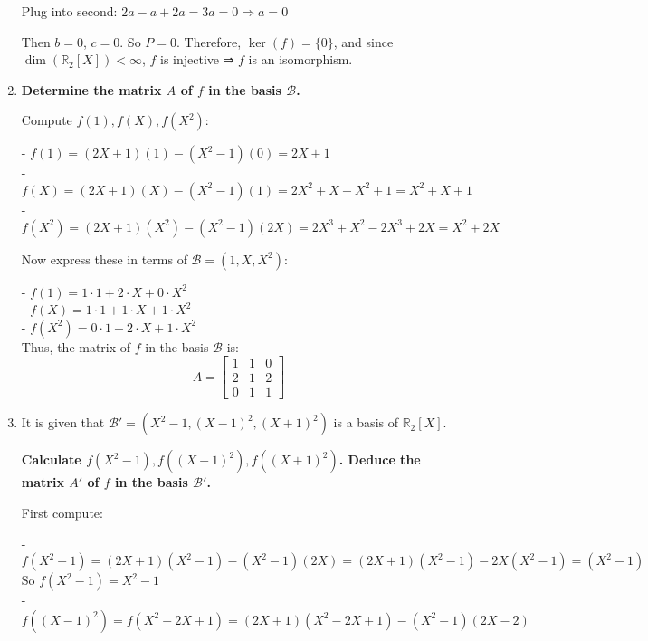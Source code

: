 \documentclass[12pt]{article}
\begin{document}
\begin{answerbox}
\begin{enumerate}
Plug into second: $ 2a - a + 2a = 3a = 0 \Rightarrow a = 0 $

Then $ b = 0 $, $ c = 0 $. So $ P = 0 $. Therefore, $ \ker(f) = \{0\} $, and since $ \dim(\mathbb{R}_2[X]) < \infty $, $ f $ is injective ⇒ $ f $ is an isomorphism.

\bigskip

\item \textbf{Determine the matrix $ A $ of $ f $ in the basis $ \mathcal{B} $.}

Compute $ f(1), f(X), f(X^2) $:

- $ f(1) = (2X + 1)(1) - (X^2 - 1)(0) = 2X + 1 $ \\
- $ f(X) = (2X + 1)(X) - (X^2 - 1)(1) = 2X^2 + X - X^2 + 1 = X^2 + X + 1 $ \\
- $ f(X^2) = (2X + 1)(X^2) - (X^2 - 1)(2X) = 2X^3 + X^2 - 2X^3 + 2X = X^2 + 2X $

Now express these in terms of $ \mathcal{B} = (1, X, X^2) $:

- $ f(1) = 1\cdot 1 + 2\cdot X + 0\cdot X^2 $ \\
- $ f(X) = 1\cdot 1 + 1\cdot X + 1\cdot X^2 $ \\
- $ f(X^2) = 0\cdot 1 + 2\cdot X + 1\cdot X^2 $ \\

Thus, the matrix of $ f $ in the basis $ \mathcal{B} $ is:
$$
A = 
\begin{bmatrix}
1 & 1 & 0 \\
2 & 1 & 2 \\
0 & 1 & 1
\end{bmatrix}
$$

\bigskip

\item It is given that $ \mathcal{B}' = (X^2 - 1, (X - 1)^2, (X + 1)^2) $ is a basis of $ \mathbb{R}_2[X] $.


\textbf{Calculate $ f(X^2 - 1), f((X - 1)^2), f((X + 1)^2) $. Deduce the matrix $ A' $ of $ f $ in the basis $ \mathcal{B}' $.}

First compute:

- $ f(X^2 - 1) = (2X + 1)(X^2 - 1) - (X^2 - 1)(2X) = (2X + 1)(X^2 - 1) - 2X(X^2 - 1) = (X^2 - 1) $ \\

So $ f(X^2 - 1) = X^2 - 1 $ \\

- $ f((X - 1)^2) = f(X^2 - 2X + 1) = (2X + 1)(X^2 - 2X + 1) - (X^2 - 1)(2X - 2) $ \\


\end{enumerate}
\end{answerbox}
\end{document}
